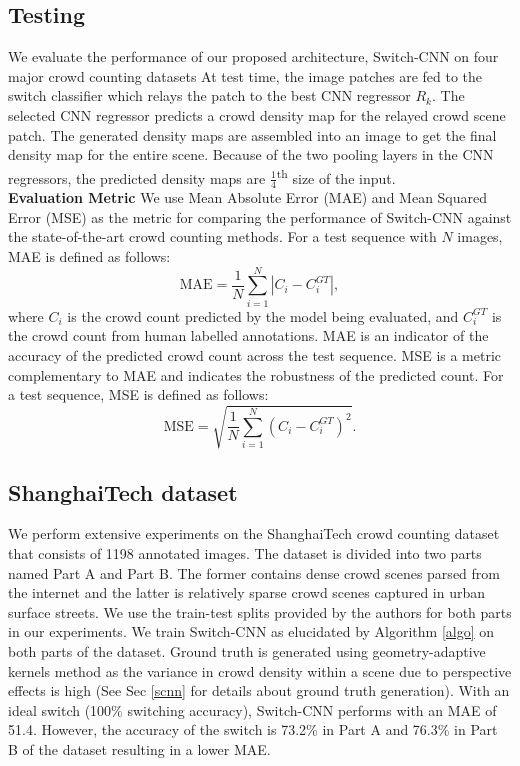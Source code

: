 \documentclass[10pt,twocolumn,letterpaper]{article}
\begin{document}
\subsection{Testing} We evaluate the performance of our proposed architecture, Switch-CNN on four major crowd counting datasets 
At test time, the image patches are fed to the switch classifier which relays the patch to the best CNN regressor $R_k$. The selected CNN regressor predicts a crowd density map for the relayed crowd scene patch. The generated density maps are assembled into an image to get the final density map for the entire scene. Because of the two pooling layers in the CNN regressors, the predicted density maps are $\frac{1}{4}$\textsuperscript{th} size of the input. \newline\\
\textbf{Evaluation Metric} We use Mean Absolute Error (MAE) and Mean Squared Error
(MSE) as the metric for comparing the performance of Switch-CNN against the state-of-the-art crowd counting methods. For a test sequence with $N$ images, MAE is defined as follows:
\begin{equation}
\textrm{MAE}=\frac{1}{N}\sum_{i=1}^{N}|C_{i}-C_{i}^{GT}|,
\label{mae}
\end{equation}
where $C_{i}$ is the crowd count predicted by the model being evaluated, and $C_{i}^{GT}$ is the
crowd count from human labelled annotations. MAE is an indicator of the accuracy of the predicted crowd count across the test sequence. MSE is a metric complementary to MAE and indicates the robustness of the predicted count. For a test sequence, MSE is defined as follows:
\begin{equation}
\textrm{MSE}=\sqrt{\frac{1}{N}\sum_{i=1}^{N}(C_{i}-C_{i}^{GT})^{2}}.
\label{mse}
\end{equation}



\subsection{ShanghaiTech dataset}

We perform extensive experiments on the ShanghaiTech crowd counting dataset~\cite{zhang2016single} that consists of 1198 annotated images. The dataset is divided into two parts named Part A and Part B. The former contains dense crowd scenes parsed from the internet and the latter is relatively sparse crowd scenes captured in urban surface streets. We use the train-test splits provided by the authors for both parts in our experiments. We train Switch-CNN as elucidated by Algorithm \ref{algo} on both parts of the dataset. Ground truth is generated
using geometry-adaptive kernels method as the variance in crowd density within a scene due to perspective effects is high (See Sec \ref{scnn} for details about ground truth generation). With an ideal switch (100\% switching accuracy), Switch-CNN performs with an MAE of 51.4. However, the accuracy of the switch is 73.2\% in Part A and 76.3\% in Part B of the dataset resulting in a lower MAE. 
\end{document}
